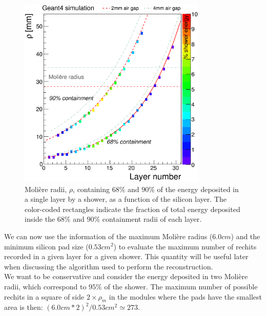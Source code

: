 \begin{figure}
\centerline{\includegraphics[width=0.8\textwidth]{intro/moliereHgcal.png}}
\caption{Molière radii, $\rho$, containing $68\%$ and $90\%$ of the energy deposited in a single layer by a shower, as a function of the silicon layer. The color-coded rectangles indicate
the fraction of total energy deposited inside the $68\%$ and $90\%$ containment radii of each layer.}
\label{moliereHgcal}
\end{figure}
\clearpage

We can now use the information of the maximum Molière radius ($6.0 \unit{cm}$) and the minimum silicon pad size ($0.53 \unit{cm^2}$) to evaluate the maximum number of rechits recorded in a given layer for a given shower. This quantity will be useful later when discussing the algorithm used to perform the reconstruction.\\
We want to be conservative and consider the energy deposited in two Molière radii, which correspond to $95\%$ of the shower. The maximum number of possible rechits in a square of side $2 \times \rho_m$ in the modules where the pads have the smallest area is then: $(6.0 \unit{cm} * 2)^2/0.53 \unit{cm^2} \simeq 273$.

